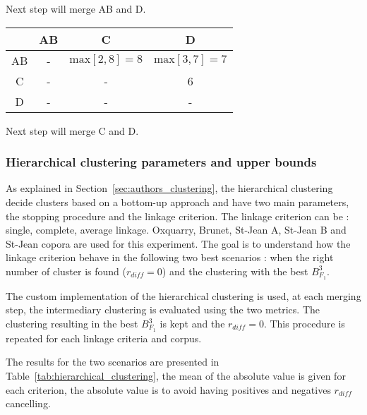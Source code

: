 \begin{example}
  \vspace{0.2cm}
  Next step will merge AB and D.

  \vspace{0.5cm}

  \begin{subexample}{\linewidth}
    \centering
    \begin{tabular}{c|c c c}
      \toprule
        & AB & C & D \\
      \midrule
      AB & - & $\text{max} \left[2, 8 \right] = 8$ & $\text{max} \left[3, 7 \right] = 7$ \\
      C  & - & - & 6 \\
      D  & - & - & - \\
      \bottomrule
    \end{tabular}
  \end{subexample}

  \vspace{0.2cm}
  Next step will merge C and D.
\end{example}


\subsubsection{Hierarchical clustering parameters and upper bounds\label{sec:hierarchical_clustering}}

As explained in Section~\ref{sec:authors_clustering}, the hierarchical clustering decide clusters based on a bottom-up approach and have two main parameters, the stopping procedure and the linkage criterion.
The linkage criterion can be : single, complete, average linkage.
Oxquarry, Brunet, St-Jean A, St-Jean B and St-Jean copora are used for this experiment.
The goal is to understand how the linkage criterion behave in the following two best scenarios : when the right number of cluster is found ($r_{diff} = 0$) and the clustering with the best $B^3_{F_1}$.

The custom implementation of the hierarchical clustering is used, at each merging step, the intermediary clustering is evaluated using the two metrics.
The clustering resulting in the best $B^3_{F_1}$ is kept and the $r_{diff} = 0$.
This procedure is repeated for each linkage criteria and corpus.

The results for the two scenarios are presented in Table~\ref{tab:hierarchical_clustering}, the mean of the absolute value is given for each criterion, the absolute value is to avoid having positives and negatives $r_{diff}$ cancelling.

